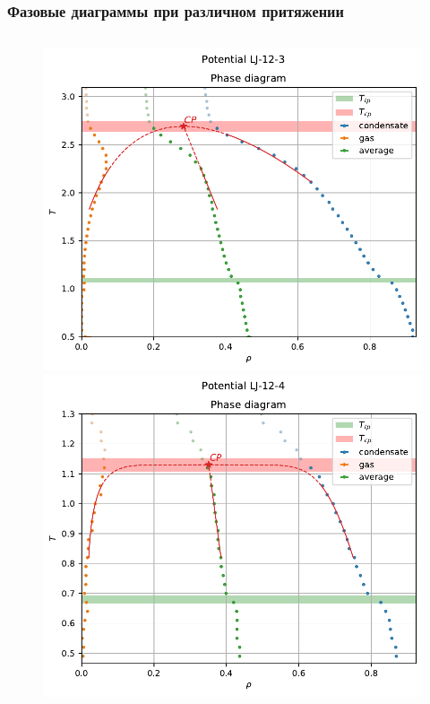 \documentclass[pdf,hyperref={unicode}]{beamer}
\begin{document}
\begin{frame}
\transdissolve[duration=0.2]
\frametitle{Фазовые диаграммы при различном притяжении}

\begin{columns}

\begin{column}{0.55\linewidth}
{
\begin{figure}[h]
\begin{center}
\begin{minipage}[h]{0.47\linewidth}
\includegraphics[width=\textwidth, keepaspectratio]{plot_phase_diagram_Potential LJ-12-3_1}
\end{minipage}
\begin{minipage}[h]{0.47\linewidth}
\includegraphics[width=\textwidth, keepaspectratio]{plot_phase_diagram_Potential LJ-12-4_1}
\end{minipage}


\end{center}
\end{figure}}
\end{column}
\end{columns}
\end{frame}
\end{document}
